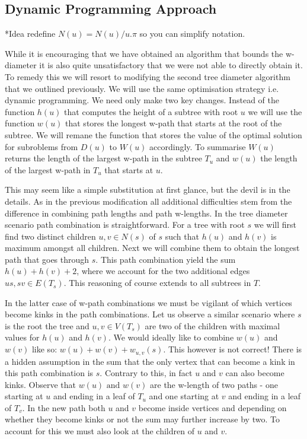 \subsection{Dynamic Programming Approach}

*Idea redefine $N(u) = N(u) / u.\pi$ so you can simplify notation.

While it is encouraging that we have obtained an algorithm that bounds the w-diameter it is also quite unsatisfactory that we were not able to directly obtain it. To remedy this we will resort to modifying the second tree diameter algorithm that we outlined previously. We will use the same optimisation strategy i.e. dynamic programming. We need only make two key changes. Instead of the function $h(u)$ that computes the height of a subtree with root $u$ we will use the function $w(u)$ that stores the longest w-path that starts at the root of the subtree. We will remane the function that stores the value of the optimal solution for subroblems from $D(u)$ to $W(u)$ accordingly. To summarise $W(u)$ returns the length of the largest w-path in the subtree $T_u$ and $w(u)$ the length of the largest w-path in $T_u$ that starts at $u$.

This may seem like a simple substitution at first glance, but the devil is in the details. As in the previous modification all additional difficulties stem from the difference in combining path lengths and path w-lengths. In the tree diameter scenario path combination is straightforward. For a tree with root $s$ we will first find two distinct children $u, v \in N(s)$ of $s$ such that $h(u)$ and $h(v)$ is maximum amongst all children. Next we will combine them to obtain the longest path that goes through $s$. This path combination yield the sum $h(u) + h(v) + 2$, where we account for the two additional edges $us, sv \in E(T_s)$. This reasoning of course extends to all subtrees in $T$.

In the latter case of w-path combinations we must be vigilant of which vertices become kinks in the path combinations. Let us observe a similar scenario where $s$ is the root the tree and $u, v \in V(T_s)$ are two of the children with maximal values for $h(u)$ and $h(v)$. We would ideally like to combine $w(u)$ and $w(v)$ like so: $w(u) + w(v) + w_{u, v}(s)$. This however is not correct! There is a hidden assumption in the sum that the only vertex that can become a kink in this path combination is $s$. Contrary to this, in fact $u$ and $v$ can also become kinks. Observe that $w(u) \text{ and } w(v)$ are the w-length of two paths - one starting at $u$ and ending in a leaf of $T_u$ and one starting at $v$ and ending in a leaf of $T_v$. In the new path both $u$ and $v$ become inside vertices and depending on whether they become kinks or not the sum may further increase by two. To account for this we must also look at the children of $u$ and $v$. 


